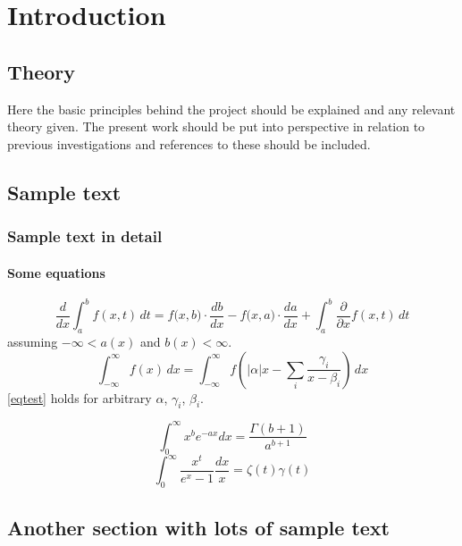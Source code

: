 \chapter{Introduction} \label{chapter:Introduction}
\section{Theory}
Here the basic principles behind the project should be explained and any relevant theory given. The present work should be put into perspective in relation to previous investigations and references to these should be included.
\section{Sample text}
\blindtext
\blindtext
\subsection{Sample text in detail}
\blindtext
\blindtext
\subsubsection{Some equations}
\blindtext
		\[{\frac{d}{dx}} \int _{a}^{b} f(x,t)\,dt = f{\big (}x, b{\big )} \cdot {\frac {db}{dx}} - f{\big (}x, a{\big )} \cdot {\frac{da}{dx}} + \int _{a}^{b}{\frac{\partial}{\partial x}} f(x,t)\,dt\]
		assuming \(-\infty < a(x)\) and \(b(x) < \infty\).
\blindtext\blindtext
\begin{equation}\label{eqtest}
		\int_{-\infty}^{\infty} f(x)\,dx = \int_{-\infty}^{\infty} f(|\alpha| x - \sum_{i}\frac{\gamma_i}{x - \beta_i})\,dx
\end{equation}
	\ref{eqtest} holds for arbitrary \(\alpha\), \(\gamma_i\), \(\beta_i\).

\begin{equation}
	\int_{0}^{\infty} x^b e^{-a x} dx = \frac{\Gamma(b+1)}{a^{b+1}}
\end{equation}
\begin{equation}
	\int_{0}^{\infty} \frac{x^t}{e^x - 1} \frac{dx}{x} = \zeta(t) \gamma(t)
\end{equation}
\blindtext
\section{Another section with lots of sample text}
\blindtext
\blindtext
\blindtext
\blindtext
\blindtext
\blindtext
\blindtext
\blindtext
\blindtext
\blindtext
\blindtext
\blindtext
\blindtext
\blindtext
\blindtext
\blindtext
\blindtext
\blindtext
\blindtext